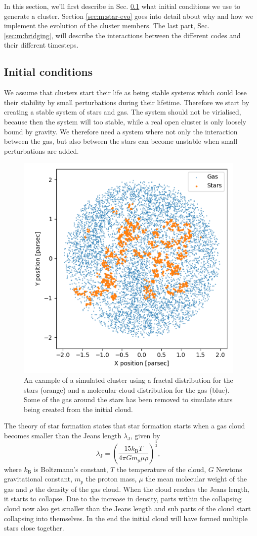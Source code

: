 \documentclass[12pt, twocolumn]{article}
\begin{document}
In this section, we'll first describe in Sec. \ref{sec:m:init} what initial conditions we use to generate a cluster. Section \ref{sec:m:star-evo} goes into detail about why and how we implement the evolution of the cluster members. The last part, Sec. \ref{sec:m:bridging}, will describe the interactions between the different codes and their different timesteps.

\subsection{Initial conditions}\label{sec:m:init}
We assume that clusters start their life as being stable systems which could lose their stability by small perturbations during their lifetime.
Therefore we start by creating a stable system of stars and gas.
The system should not be virialised, because then the system will too stable, while a real open cluster is only loosely bound by gravity.
We therefore need a system where not only the interaction between the gas, but also between the stars can become unstable when small perturbations are added.

\begin{figure}[ht]
    \centering
    \includegraphics[width=0.6\linewidth]{figures/initial_position.png}
    \caption{An example of a simulated cluster using a fractal distribution for the stars (orange) and a molecular cloud distribution for the gas (blue). Some of the gas around the stars has been removed to simulate stars being created from the initial cloud.}
    \label{fig:m:fractal-cluster}
\end{figure}

The theory of star formation states that star formation starts when a gas cloud becomes smaller than the Jeans length $\lambda_{\text{J}}$, given by
\begin{equation}
    \lambda_{\text{J}}=\left({\frac {15k_{\text{B}}T}{4\pi Gm_{p}\mu \rho }}\right)^{\frac {1}{2}},
\end{equation}
where $k_\text{B}$ is Boltzmann's constant, $T$ the temperature of the cloud, $G$ Newtons gravitational constant, $m_p$ the proton mass, $\mu$ the mean molecular weight of the gas and $\rho$ the density of the gas cloud.
When the cloud reaches the Jeans length, it starts to collapse.
Due to the increase in density, parts within the collapsing cloud now also get smaller than the Jeans length and sub parts of the cloud start collapsing into themselves.
In the end the initial cloud will have formed multiple stars close together.
\end{document}

